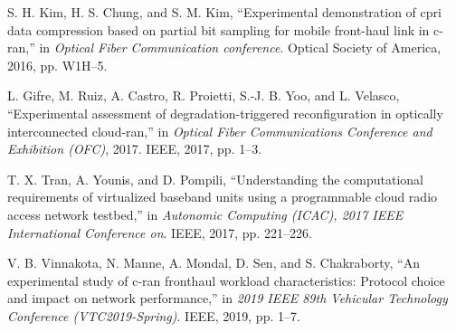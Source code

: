 \begin{multicols}{2}
\begin{thebibliography}{99}
 S. H. Kim, H. S. Chung, and S. M. Kim, “Experimental demonstration of cpri data compression based on partial bit sampling for mobile front-haul link in c-ran,” in \textit{Optical Fiber Communication conference}. Optical Society of America, 2016, pp. W1H–5.

 L. Gifre, M. Ruiz, A. Castro, R. Proietti, S.-J. B. Yoo, and L. Velasco, “Experimental assessment of degradation-triggered reconfiguration in optically interconnected cloud-ran,” in \textit{Optical Fiber Communications Conference and Exhibition (OFC)}, 2017. IEEE, 2017, pp. 1–3.

  T. X. Tran, A. Younis, and D. Pompili, “Understanding the computational requirements of virtualized baseband units using a programmable cloud radio access network testbed,” in \textit{Autonomic Computing (ICAC), 2017 IEEE International Conference on}. IEEE, 2017, pp. 221–226.

 V. B. Vinnakota, N. Manne, A. Mondal, D. Sen, and S. Chakraborty, “An experimental study of c-ran fronthaul workload characteristics: Protocol choice and impact on network performance,” in \textit{2019 IEEE 89th Vehicular Technology Conference (VTC2019-Spring)}. IEEE, 2019, pp. 1–7.

\end{thebibliography}
\end{multicols}

\vskip -1.95cm

